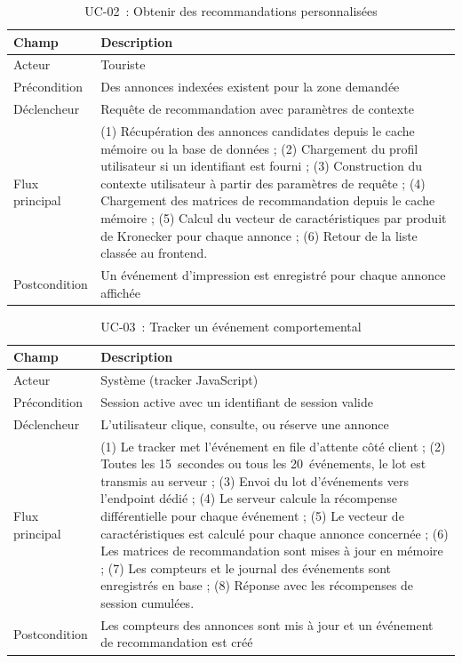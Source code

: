 \begin{table}[H]
    \centering
    \caption{UC-02~: Obtenir des recommandations personnalisées}
    \label{tab:uc02}
    \small
    \begin{tabular}{p{3cm} p{11cm}}
        \toprule
        \textbf{Champ} & \textbf{Description} \\
        \midrule
        Acteur & Touriste  \\[3pt]
        Précondition & Des annonces indexées existent pour la zone demandée \\[3pt]
        Déclencheur & Requête de recommandation avec paramètres de contexte \\[3pt]
        Flux principal &
        (1) Récupération des annonces candidates depuis le cache mémoire ou la base de données ;
        (2) Chargement du profil utilisateur si un identifiant est fourni ;
        (3) Construction du contexte utilisateur à partir des paramètres de requête ;
        (4) Chargement des matrices de recommandation depuis le cache mémoire ;
        (5) Calcul du vecteur de caractéristiques par produit de Kronecker pour chaque annonce ;
        (6) Retour de la liste classée au frontend. \\[3pt]
        Postcondition & Un événement d'impression est enregistré pour chaque annonce affichée \\
        \bottomrule
    \end{tabular}
\end{table}

\begin{table}[H]
    \centering
    \caption{UC-03~: Tracker un événement comportemental}
    \label{tab:uc03}
    \small
    \begin{tabular}{p{3cm} p{11cm}}
        \toprule
        \textbf{Champ} & \textbf{Description} \\
        \midrule
        Acteur & Système (tracker JavaScript) \\[3pt]
        Précondition & Session active avec un identifiant de session valide \\[3pt]
        Déclencheur & L'utilisateur clique, consulte, ou réserve une annonce \\[3pt]
        Flux principal &
        (1) Le tracker met l'événement en file d'attente côté client ;
        (2) Toutes les 15~secondes ou tous les 20~événements, le lot est transmis au serveur ;
        (3) Envoi du lot d'événements vers l'endpoint dédié ;
        (4) Le serveur calcule la récompense différentielle pour chaque événement ;
        (5) Le vecteur de caractéristiques est calculé pour chaque annonce concernée ;
        (6) Les matrices de recommandation sont mises à jour en mémoire ;
        (7) Les compteurs et le journal des événements sont enregistrés en base ;
        (8) Réponse avec les récompenses de session cumulées. \\[3pt]
        Postcondition & Les compteurs des annonces sont mis à jour et un événement de recommandation est créé \\
        \bottomrule
    \end{tabular}
\end{table}

